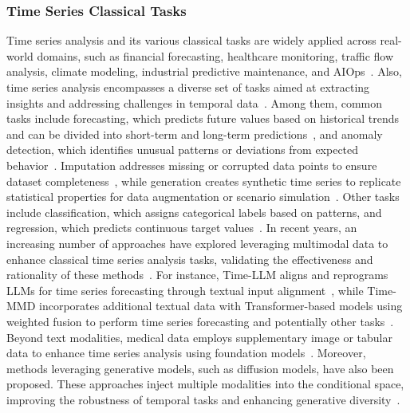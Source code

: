 \subsubsection{Time Series Classical Tasks}
Time series analysis and its various classical tasks are widely applied across real-world domains, such as financial forecasting, healthcare monitoring, traffic flow analysis, climate modeling, industrial predictive maintenance, and AIOps~\cite{shumway2000time,nie2024survey,yang2021early,yang2023sgdp,liang2024foundation}. Also, time series analysis encompasses a diverse set of tasks aimed at extracting insights and addressing challenges in temporal data~\cite{hamilton2020time,kirchgassner2012introduction}. Among them, common tasks include forecasting, which predicts future values based on historical trends and can be divided into short-term and long-term predictions~\cite{wen2022transformers}, and anomaly detection, which identifies unusual patterns or deviations from expected behavior~\cite{zamanzadeh2024deep}. Imputation addresses missing or corrupted data points to ensure dataset completeness~\cite{du2024tsi}, while generation creates synthetic time series to replicate statistical properties for data augmentation or scenario simulation~\cite{yang2024survey}. Other tasks include classification, which assigns categorical labels based on patterns, and regression, which predicts continuous target values~\cite{mohammadi2024deep,yang2021long}. In recent years, an increasing number of approaches have explored leveraging multimodal data to enhance classical time series analysis tasks, validating the effectiveness and rationality of these methods~\cite{zhou2023one,liutime,gruver2024large,chang2023llm4ts,cao2023tempo,yin2023survey}. For instance, Time-LLM aligns and reprograms LLMs for time series forecasting through textual input alignment~\cite{jin2023time}, while Time-MMD incorporates additional textual data with Transformer-based models using weighted fusion to perform time series forecasting and potentially other tasks~\cite{liutime}. Beyond text modalities, medical data employs supplementary image or tabular data to enhance time series analysis using foundation models~\cite{hollmann2025accurate,moor2023foundation}. Moreover, methods leveraging generative models, such as diffusion models, have also been proposed. These approaches inject multiple modalities into the conditional space, improving the robustness of temporal tasks and enhancing generative diversity~\cite{yang2024survey}.


